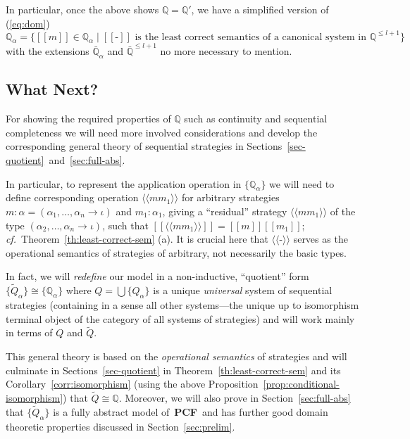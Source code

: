 \documentclass[fleqn]{LMCS}
\theoremstyle{plain}\newtheorem{satz}[thm]{Satz}
\theoremstyle{plain}\newtheorem{hyp}[thm]{Hypothesis}
\theoremstyle{plain}\newtheorem{hyps}[thm]{Hypotheses}
\theoremstyle{definition}\newtheorem{note}[thm]{Note}
\def\cf{{\em cf.}}
\newcommand{\defis}{\mbox{-}}
\newcommand{\setof}[1]{\{#1\}}
\newcommand{\arr}{\rightarrow}
\newcommand{\lla}{\langle\!\langle}
\newcommand{\rra}{\rangle\!\rangle}
\newcommand{\Osem}[1]{\lla #1 \rra}
\newcommand{\Dsem}[1]{[\![ #1 ]\!]}
\newcommand{\bbQ}{\mathbb{Q}}
\newcommand{\Basictype}{\iota}
\newcommand{\PCF}{\mbox{\bf PCF}}
\newcommand{\tQ}{\tilde{Q}}
\newcommand{\?}{\mbox{?}}
\begin{document}
\noindent
In particular, once the above shows $\bbQ=\bbQ'$, 
we have a simplified version of (\ref{eq:dom})
\[
\bbQ_\alpha  = 
 \{\Dsem{m}\!\in\!\bbQ_{\alpha}
\mid\Dsem{\defis}\textrm{ is the least correct semantics of a 
canonical system in }\bbQ^{\le l+1}\} 
\]
with the extensions 
$\bar{\bbQ}_{\alpha}$ and $\bar{\bbQ}^{\le l+1}$ no more necessary to mention. 








\subsection{What Next?}
\label{sec:what-next}

\noindent
For showing the required properties of $\bbQ$ such as continuity 
and sequential completeness 
we will need more involved considerations and  
develop the corresponding general theory of sequential strategies 
\cite{Saz76SMZH,Saz76AL}
in Sections~\ref{sec-quotient}~and~\ref{sec:full-abs}. 

In particular, to represent the application operation in 
$\setof{\bbQ_\alpha}$
we will need to define corresponding operation
$\Osem{mm_1}$ for arbitrary strategies
$m:\alpha = (\alpha_1,\ldots,\alpha_n \arr \Basictype)$
and \mbox{$m_1 : \alpha_1$}, giving a ``residual'' strategy 
$\Osem{mm_1}$ of the type
$(\alpha_2,\ldots,\alpha_n \arr \Basictype)$, such that
$\Dsem{\Osem{mm_1}}=\Dsem{m}\Dsem{m_1}$; 
\cf\ Theorem~\ref{th:least-correct-sem} (a).
It is crucial here that $\Osem{\defis}$ serves as the operational semantics of strategies of arbitrary, not necessarily the basic types. 


In fact, we will \emph{redefine} our model in a non-inductive, ``quotient'' form 
$\setof{\tQ_{\alpha}}\cong\setof{\bbQ_{\alpha}}$ where $Q=\bigcup\setof{Q_{\alpha}}$ 
is a unique \emph{universal} system of sequential strategies 
(containing in a sense all other systems---the unique up to isomorphism 
terminal object of the category 
of all systems of strategies) and will work mainly in terms of $Q$ and $\tQ$. 




This general theory is based on the 
\emph{operational semantics} of strategies and will culminate in 
Sections~\ref{sec-quotient} in 
Theorem~\ref{th:least-correct-sem} and its Corollary~\ref{corr:isomorphism} 
(using the above Proposition~\ref{prop:conditional-isomorphism}) that $\tQ\cong\bbQ$. 
Moreover, 
we will also prove in Section~\ref{sec:full-abs} that $\{\tQ_{\alpha}\}$ is a fully
abstract 
model of~\PCF\ and has further good domain theoretic properties discussed in
Section~\ref{sec:prelim}.  
\end{document}
